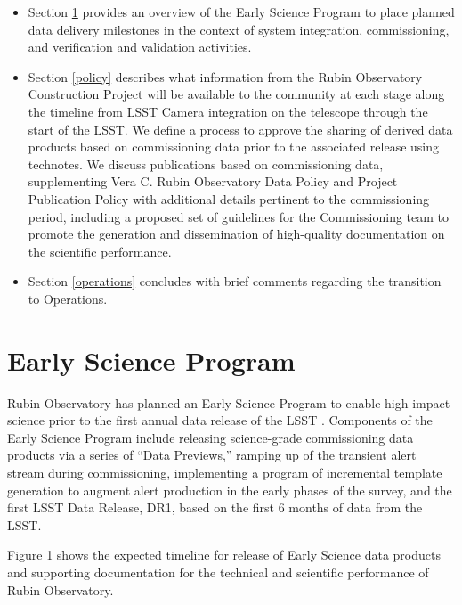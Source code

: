 \documentclass[SE,authoryear,toc,lsstdraft]{lsstdoc}
\begin{document}
\begin{itemize}

  \item Section \ref{early_science} provides an overview of the Early Science Program to place planned data delivery milestones in the context of system integration, commissioning, and verification and validation activities.

  \item Section \ref{policy} describes what information from the Rubin Observatory Construction Project will be available to the community at each stage along the timeline from LSST Camera integration on the telescope through the start of the LSST.
  We define a process to approve the sharing of derived data products based on commissioning data prior to the associated release using technotes.
  We discuss publications based on commissioning data, supplementing Vera C. Rubin Observatory Data Policy  and Project Publication Policy \citep{LPM-162} with additional details pertinent to the commissioning period, including a proposed set of guidelines for the Commissioning team to promote the generation and dissemination of high-quality documentation on the scientific performance.

  \item Section \ref{operations} concludes with brief comments regarding the transition to Operations.

\end{itemize}

\section{Early Science Program}
\label{early_science}

Rubin Observatory has planned an Early Science Program to enable high-impact science prior to the first annual data release of the LSST . Components of the Early Science Program include releasing science-grade commissioning data products via a series of ``Data Previews,'' ramping up of the transient alert stream during commissioning, implementing a program of incremental template generation to augment alert production in the early phases of the survey, and the first LSST Data Release, DR1, based on the first 6 months of data from the LSST.

Figure 1 shows the expected timeline for release of Early Science data products and supporting documentation for the technical and scientific performance of Rubin Observatory.
\end{document}
